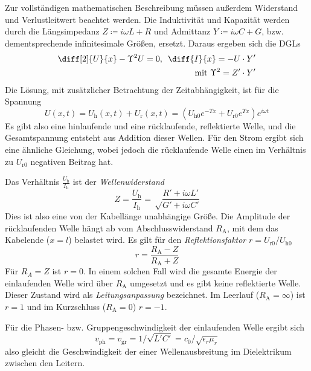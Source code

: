 \documentclass{article}
\newcommand{\defc}{black}
\newcommand{\colorT}[2][blue]{\color{#1}{#2}\color{\defc}}
\newcommand{\question}[1]{\colorT[purple]{\textbf{(#1)}}}
\newcommand{\todo}[1]{\colorT[red]{\textbf{(#1)}}}
\newcommand{\mr}{\mathrm}
\begin{document}
Zur vollständigen mathematischen Beschreibung müssen außerdem Widerstand und Verlustleitwert beachtet werden.
Die Induktivität und Kapazität werden durch die Längsimpedanz $Z \coloneq i\omega L + R$
und Admittanz $Y \coloneq i\omega C + G$, bzw. dementsprechende infinitesimale Größen, ersetzt.
Daraus ergeben sich die DGLs
\begin{align}
  \diff[2]{U}{x} - \Upsilon^2U = 0, \enspace \diff{I}{x} = -U\cdot Y'\\
  \text{mit } \Upsilon^2 = Z'\cdot Y' \nonumber
\end{align}
Die Lösung, mit zusätzlicher Betrachtung der Zeitabhängigkeit, ist für die Spannung
\begin{equation}
  U(x, t) = U_\mr h (x, t) + U_\mr r (x, t) = (U_{\mr h0} e^{-\Upsilon x} + U_{\mr r0} e^{\Upsilon x}) e^{i\omega t} 
\end{equation}
\todo{wo kommt $\omega$ her?}
Es gibt also eine hinlaufende und eine rücklaufende, reflektierte Welle, und die Gesamtspannung entsteht aus Addition dieser Wellen.
Für den Strom ergibt sich eine ähnliche Gleichung, wobei jedoch die rücklaufende Welle einen im Verhältnis zu $U_{\mr r0}$ negativen Beitrag hat.

Das Verhältnis $\frac{U_\mr h}{I_\mr h}$ ist der \textit{Wellenwiderstand}
\begin{equation}
  Z = \frac{U_\mr h}{I_\mr h} = \sqrt\frac{R' + i\omega L'}{G' + i\omega C'}
\end{equation}
Dies ist also eine von der Kabellänge unabhängige Größe.
Die Amplitude der rücklaufenden Welle hängt ab vom Abschlusswiderstand
$R_\mr A$, mit dem das Kabelende ($x = l$) belastet wird. Es gilt für den \textit{Reflektionsfaktor} $r = U_{\mr r0} / U_{\mr h0}$
\begin{equation}
  r = \frac{R_\mr A - Z}{R_\mr A + Z}
\end{equation}
Für $R_A = Z$ \question{ist RA dann komplex?} ist $r = 0$. In einem solchen Fall wird die gesamte Energie der einlaufenden Welle wird über $R_\mr A$ umgesetzt
und es gibt keine reflektierte Welle. Dieser Zustand wird als \textit{Leitungsanpassung} bezeichnet. Im Leerlauf ($R_\mr A = \infty$)
ist $r=1$ und im Kurzschluss ($R_\mr A = 0$) $r=-1$.

Für die Phasen- bzw. Gruppengeschwindigkeit der einlaufenden Welle ergibt sich
\begin{equation}
  v_\mr{ph} = v_\mr{gr} = 1/\sqrt{L'C'} = c_0/\sqrt{\epsilon_r \mu_r}
\end{equation}
also gleicht die Geschwindigkeit der einer Wellenausbreitung im Dielektrikum zwischen den Leitern.
\end{document}
